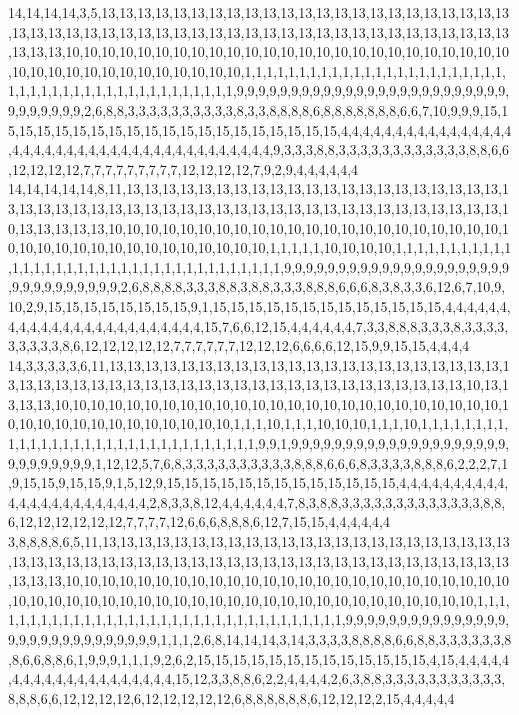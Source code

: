 14,14,14,14,3,5,13,13,13,13,13,13,13,13,13,13,13,13,13,13,13,13,13,13,13,13,13,13,13,13,13,13,13,13,13,13,13,13,13,13,13,13,13,13,13,13,13,13,13,13,13,13,13,13,13,13,13,13,13,13,10,10,10,10,10,10,10,10,10,10,10,10,10,10,10,10,10,10,10,10,10,10,10,10,10,10,10,10,10,10,10,10,10,10,10,10,10,10,1,1,1,1,1,1,1,1,1,1,1,1,1,1,1,1,1,1,1,1,1,1,1,1,1,1,1,1,1,1,1,1,1,1,1,1,1,1,1,1,1,1,1,1,1,9,9,9,9,9,9,9,9,9,9,9,9,9,9,9,9,9,9,9,9,9,9,9,9,9,9,9,9,9,9,9,9,2,6,8,8,3,3,3,3,3,3,3,3,3,3,8,3,3,8,8,8,8,6,8,8,8,8,8,8,8,6,6,7,10,9,9,9,15,15,15,15,15,15,15,15,15,15,15,15,15,15,15,15,15,15,15,15,4,4,4,4,4,4,4,4,4,4,4,4,4,4,4,4,4,4,4,4,4,4,4,4,4,4,4,4,4,4,4,4,4,4,4,4,4,4,4,4,9,3,3,3,8,8,3,3,3,3,3,3,3,3,3,3,3,3,8,8,6,6,12,12,12,12,7,7,7,7,7,7,7,7,7,12,12,12,12,7,9,2,9,4,4,4,4,4,4
14,14,14,14,14,8,11,13,13,13,13,13,13,13,13,13,13,13,13,13,13,13,13,13,13,13,13,13,13,13,13,13,13,13,13,13,13,13,13,13,13,13,13,13,13,13,13,13,13,13,13,13,13,13,13,13,10,13,13,13,13,13,10,10,10,10,10,10,10,10,10,10,10,10,10,10,10,10,10,10,10,10,10,10,10,10,10,10,10,10,10,10,10,10,10,10,10,10,10,1,1,1,1,1,10,10,10,10,1,1,1,1,1,1,1,1,1,1,1,1,1,1,1,1,1,1,1,1,1,1,1,1,1,1,1,1,1,1,1,1,1,1,1,1,9,9,9,9,9,9,9,9,9,9,9,9,9,9,9,9,9,9,9,9,9,9,9,9,9,9,9,9,9,9,9,2,6,8,8,8,8,3,3,3,8,8,3,8,8,3,3,3,8,8,8,6,6,6,8,3,8,3,3,6,12,6,7,10,9,10,2,9,15,15,15,15,15,15,15,15,9,1,15,15,15,15,15,15,15,15,15,15,15,15,15,4,4,4,4,4,4,4,4,4,4,4,4,4,4,4,4,4,4,4,4,4,4,4,4,15,7,6,6,12,15,4,4,4,4,4,4,7,3,3,8,8,8,3,3,3,8,3,3,3,3,3,3,3,3,3,8,6,12,12,12,12,12,7,7,7,7,7,7,12,12,12,6,6,6,6,12,15,9,9,15,15,4,4,4,4
14,3,3,3,3,3,6,11,13,13,13,13,13,13,13,13,13,13,13,13,13,13,13,13,13,13,13,13,13,13,13,13,13,13,13,13,13,13,13,13,13,13,13,13,13,13,13,13,13,13,13,13,13,13,13,13,10,13,13,13,13,10,10,10,10,10,10,10,10,10,10,10,10,10,10,10,10,10,10,10,10,10,10,10,10,10,10,10,10,10,10,10,10,10,10,10,10,10,10,1,1,1,10,1,1,1,10,10,10,1,1,1,10,1,1,1,1,1,1,1,1,1,1,1,1,1,1,1,1,1,1,1,1,1,1,1,1,1,1,1,1,1,1,1,9,9,1,9,9,9,9,9,9,9,9,9,9,9,9,9,9,9,9,9,9,9,9,9,9,9,9,9,9,9,9,1,12,12,5,7,6,8,3,3,3,3,3,3,3,3,3,3,8,8,8,6,6,6,8,3,3,3,3,8,8,8,6,2,2,2,7,1,9,15,15,9,15,15,9,1,5,12,9,15,15,15,15,15,15,15,15,15,15,15,15,15,4,4,4,4,4,4,4,4,4,4,4,4,4,4,4,4,4,4,4,4,4,4,4,2,8,3,3,8,12,4,4,4,4,4,4,7,8,3,8,8,3,3,3,3,3,3,3,3,3,3,3,3,3,8,8,6,12,12,12,12,12,12,7,7,7,7,12,6,6,6,8,8,8,6,12,7,15,15,4,4,4,4,4,4
3,8,8,8,8,6,5,11,13,13,13,13,13,13,13,13,13,13,13,13,13,13,13,13,13,13,13,13,13,13,13,13,13,13,13,13,13,13,13,13,13,13,13,13,13,13,13,13,13,13,13,13,13,13,13,13,13,13,13,13,13,13,10,10,10,10,10,10,10,10,10,10,10,10,10,10,10,10,10,10,10,10,10,10,10,10,10,10,10,10,10,10,10,10,10,10,10,10,10,10,10,10,10,10,10,10,10,10,10,10,10,10,10,1,1,1,1,1,1,1,1,1,1,1,1,1,1,1,1,1,1,1,1,1,1,1,1,1,1,1,1,1,1,1,1,1,1,9,9,9,9,9,9,9,9,9,9,9,9,9,9,9,9,9,9,9,9,9,9,9,9,9,9,9,9,9,1,1,1,2,6,8,14,14,14,3,14,3,3,3,3,8,8,8,8,6,6,8,8,3,3,3,3,3,3,8,8,6,6,8,8,6,1,9,9,9,1,1,1,9,2,6,2,15,15,15,15,15,15,15,15,15,15,15,15,15,4,15,4,4,4,4,4,4,4,4,4,4,4,4,4,4,4,4,4,4,4,4,15,12,3,3,8,8,6,2,2,4,4,4,4,2,6,3,8,8,3,3,3,3,3,3,3,3,3,3,3,8,8,8,6,6,12,12,12,12,6,12,12,12,12,12,6,8,8,8,8,8,8,6,12,12,12,2,15,4,4,4,4,4
